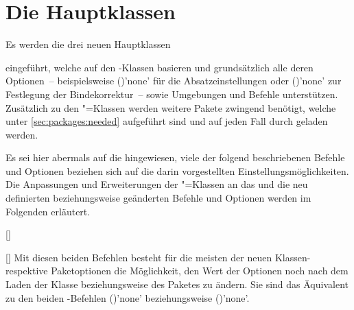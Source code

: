 \chapter[%
  Die Hauptklassen \Class*{tudscrbook}, \Class*{tudscrreprt} und 
  \Class*{tudscrartcl}%
]{Die Hauptklassen}
%
%
%
\begin{Declaration*}{}
\begin{Declaration*}{}
\begin{Declaration*}{}
Es werden die drei neuen Hauptklassen
%
\begin{description}
\item {}
\item {}
\item {}
\end{description}
%
eingeführt, welche auf den \KOMAScript-Klassen basieren und grundsätzlich alle 
deren Optionen~-- beispielsweise 
()'none' für die 
Absatzeinstellungen oder 
()'none' zur Festlegung der 
Bindekorrektur~-- sowie Umgebungen und Befehle unterstützen. Zusätzlich zu den 
\KOMAScript"=Klassen werden weitere Pakete zwingend benötigt, welche unter 
\autoref{sec:packages:needed} aufgeführt sind und auf jeden Fall durch 
\TUDScript geladen werden.

Es sei hier abermals auf die  
hingewiesen, viele der folgend beschriebenen Befehle und Optionen beziehen sich 
auf die darin vorgestellten Einstellungsmöglichkeiten. Die Anpassungen und 
Erweiterungen der \KOMAScript"=Klassen an das \CD und die neu definierten 
beziehungsweise geänderten Befehle und Optionen werden im Folgenden erläutert.

\begin{Declaration}{[]}
\begin{Declaration}{[]}
\printdeclarationlist%
%
%
Mit diesen beiden Befehlen besteht für die meisten der neuen Klassen- respektive
Paketoptionen die Möglichkeit, den Wert der Optionen noch nach dem Laden der 
Klasse beziehungsweise des Paketes zu ändern. Sie sind das Äquivalent zu den 
beiden \KOMAScript-Befehlen ()'none' 
beziehungsweise ()'none'.


\end{Declaration}
\end{Declaration}
\end{Declaration*}
\end{Declaration*}
\end{Declaration*}
